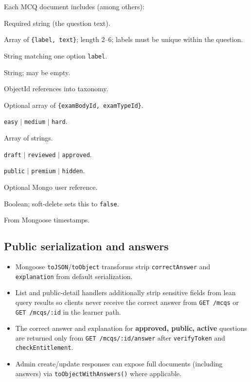 \documentclass[11pt,a4paper]{article}
\begin{document}
Each MCQ document includes (among others):

\begin{description}[style=nextline]
  \item[\texttt{questionStem}] Required string (the question text).
  \item[\texttt{options}] Array of \texttt{\{label, text\}}; length 2--6; labels must be unique within the question.
  \item[\texttt{correctAnswer}] String matching one option \texttt{label}.
  \item[\texttt{explanation}] String; may be empty.
  \item[\texttt{subjectId}, \texttt{topicId}, \texttt{subtopicId}] ObjectId references into taxonomy.
  \item[\texttt{examMappings}] Optional array of \texttt{\{examBodyId, examTypeId\}}.
  \item[\texttt{difficulty}] \texttt{easy} $|$ \texttt{medium} $|$ \texttt{hard}.
  \item[\texttt{tags}] Array of strings.
  \item[\texttt{reviewStatus}] \texttt{draft} $|$ \texttt{reviewed} $|$ \texttt{approved}.
  \item[\texttt{visibilityStatus}] \texttt{public} $|$ \texttt{premium} $|$ \texttt{hidden}.
  \item[\texttt{createdBy}] Optional Mongo user reference.
  \item[\texttt{isActive}] Boolean; soft-delete sets this to \texttt{false}.
  \item[\texttt{createdAt}, \texttt{updatedAt}] From Mongoose timestamps.
\end{description}

\subsection{Public serialization and answers}

\begin{itemize}[leftmargin=*]
  \item Mongoose \texttt{toJSON}/\texttt{toObject} transforms strip \texttt{correctAnswer} and \texttt{explanation} from default serialization.
  \item List and public-detail handlers additionally strip sensitive fields from lean query results so clients never receive the correct answer from \texttt{GET /mcqs} or \texttt{GET /mcqs/:id} in the learner path.
  \item The correct answer and explanation for \textbf{approved, public, active} questions are returned only from \texttt{GET /mcqs/:id/answer} after \texttt{verifyToken} and \texttt{checkEntitlement}.
  \item Admin create/update responses can expose full documents (including answers) via \texttt{toObjectWithAnswers()} where applicable.
\end{itemize}
\end{document}
